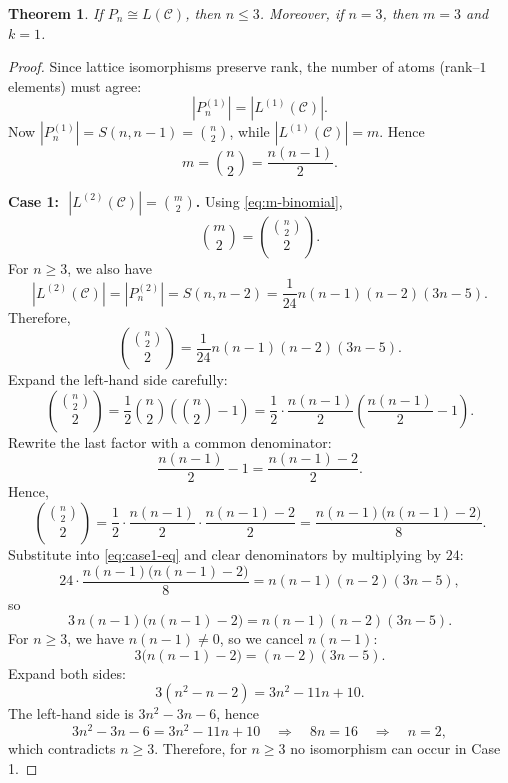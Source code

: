 \documentclass[10pt,a4paper]{amsart}
\newtheorem{theorem}{Theorem}
\begin{document}
\begin{theorem}\label{thm:Pn-necessary}
If \(P_n \cong L(\mathcal C)\), then \(n\le 3\).
Moreover, if \(n=3\), then \(m=3\) and \(k=1\).
\end{theorem}

\begin{proof}
Since lattice isomorphisms preserve rank, the number of atoms (rank--\(1\) elements) must agree:
\[
|P_n^{(1)}| = |L^{(1)}(\mathcal C)|.
\]
Now \(|P_n^{(1)}| = S(n,n-1)=\binom{n}{2}\), while \(|L^{(1)}(\mathcal C)|=m\). Hence
\begin{equation}\label{eq:m-binomial}
m=\binom{n}{2}=\frac{n(n-1)}{2}.
\end{equation}

\medskip
\noindent\textbf{Case 1: \(\;|L^{(2)}(\mathcal C)|=\binom{m}{2}\).}
Using \eqref{eq:m-binomial},
\[
\binom{m}{2}=\binom{\binom{n}{2}}{2}.
\]
For \(n\ge 3\), we also have
\[
|L^{(2)}(\mathcal C)|=|P_n^{(2)}|=S(n,n-2)=\frac{1}{24}n(n-1)(n-2)(3n-5).
\]
Therefore,
\begin{equation}\label{eq:case1-eq}
\binom{\binom{n}{2}}{2}=\frac{1}{24}n(n-1)(n-2)(3n-5).
\end{equation}
Expand the left-hand side carefully:
\[
\binom{\binom{n}{2}}{2}
=\frac{1}{2}\binom{n}{2}\!\left(\binom{n}{2}-1\right)
=\frac{1}{2}\cdot \frac{n(n-1)}{2}\left(\frac{n(n-1)}{2}-1\right).
\]
Rewrite the last factor with a common denominator:
\[
\frac{n(n-1)}{2}-1=\frac{n(n-1)-2}{2}.
\]
Hence,
\[
\binom{\binom{n}{2}}{2}
=\frac{1}{2}\cdot \frac{n(n-1)}{2}\cdot \frac{n(n-1)-2}{2}
=\frac{n(n-1)\bigl(n(n-1)-2\bigr)}{8}.
\]
Substitute into \eqref{eq:case1-eq} and clear denominators by multiplying by \(24\):
\[
24\cdot \frac{n(n-1)\bigl(n(n-1)-2\bigr)}{8}
= n(n-1)(n-2)(3n-5),
\]
so
\[
3\,n(n-1)\bigl(n(n-1)-2\bigr)=n(n-1)(n-2)(3n-5).
\]
For \(n\ge 3\), we have \(n(n-1)\neq 0\), so we cancel \(n(n-1)\):
\[
3\bigl(n(n-1)-2\bigr)=(n-2)(3n-5).
\]
Expand both sides:
\[
3(n^2-n-2) = 3n^2-11n+10.
\]
The left-hand side is \(3n^2-3n-6\), hence
\[
3n^2-3n-6 = 3n^2-11n+10
\quad\Longrightarrow\quad
8n=16
\quad\Longrightarrow\quad
n=2,
\]
which contradicts \(n\ge 3\). Therefore, for \(n\ge 3\) no isomorphism can occur in Case 1.


\end{proof}
\end{document}
